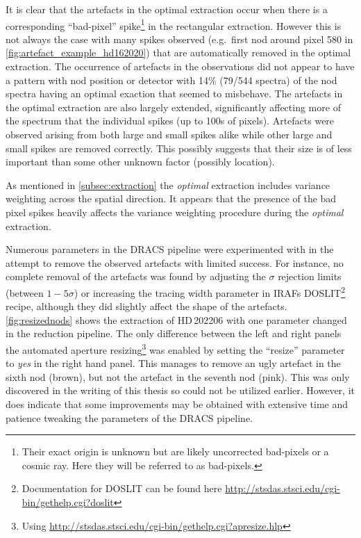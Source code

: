 It is clear that the artefacts in the optimal extraction occur when there is a corresponding ``bad-pixel'' spike\footnote{Their exact origin is unknown but are likely uncorrected bad-pixels or a cosmic ray.
Here they will be referred to as bad-pixels.} in the rectangular extraction.
However this is not always the case with many spikes observed (e.g.\ first nod around pixel 580 in \cref{fig:artefact_example_hd162020}) that are automatically removed in the optimal extraction.
The occurrence of artefacts in the observations did not appear to have a pattern with nod position or detector with 14\% (79/544 spectra) of the nod spectra having an optimal exaction that seemed to misbehave.
The artefacts in the optimal extraction are also largely extended, significantly affecting more of the spectrum that the individual spikes (up to 100s of pixels).
Artefacts were observed arising from both large and small spikes alike while other large and small spikes are removed correctly.
This possibly suggests that their size is of less important than some other unknown factor (possibly location).

As mentioned in \cref{subsec:extraction} the \emph{optimal} extraction includes variance weighting across the spatial direction.
It appears that the presence of the bad pixel spikes heavily affects the variance weighting procedure during the \emph{optimal} extraction.

Numerous parameters in the {DRACS} pipeline were experimented with in the attempt to remove the observed artefacts with limited success.
For instance, no complete removal of the artefacts was found by adjusting the \(\sigma\) rejection limits (between \(1-5 \sigma\)) or increasing the tracing width parameter in {IRAF}s DOSLIT\footnote{Documentation for DOSLIT can be found here \href{http://stsdas.stsci.edu/cgi-bin/gethelp.cgi?doslit}{http://stsdas.stsci.edu/cgi-bin/gethelp.cgi?doslit}} recipe, although they did slightly affect the shape of the artefacts.
\cref{fig:resizednods} shows the extraction of HD\,202206 with one parameter changed in the reduction pipeline.
The only difference between the left and right panels the automated aperture resizing\footnote{Using \href{apresize}{http://stsdas.stsci.edu/cgi-bin/gethelp.cgi?apresize.hlp}} was enabled by setting the ``resize'' parameter to \emph{yes} in the right hand panel.
This manages to remove an ugly artefact in the sixth nod (brown), but not the artefact in the seventh nod (pink).
This was only discovered in the writing of this thesis so could not be utilized earlier.
However, it does indicate that some improvements may be obtained with extensive time and patience tweaking the parameters of the {DRACS} pipeline.

